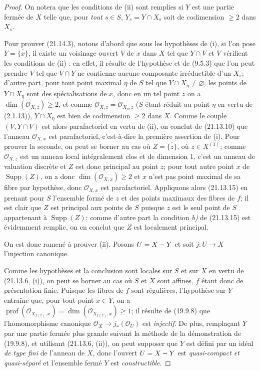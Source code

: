 \begin{proof}
On notera que les conditions de (ii) sont remplies si $Y$ est une partie fermée de $X$
telle que, pour \emph{tout} $s\in S$, $Y_s=Y\cap X_s$ soit de codimension $\geq2$ dans
$X_s$.

Pour prouver (21.14.3), notons d'abord que sous les hypothèses de (i), si l'on
pose $Y=\overline{\{x\}}$, il existe un voisinage ouvert $V$ de $x$ dans $X$ tel que
$Y\cap V$ et $V$ vérifient les conditions de (ii) : en effet, il résulte de l'hypothèse
et de (9.5.3) que l'on peut prendre $V$ tel que $V\cap Y$ ne contienne aucune
composante irréductible d'un $X_s$; d'autre part, pour tout point maximal $\eta$ de
$S$ tel que $Y\cap X_\eta\neq\varnothing$, les points de $Y\cap X_\eta$ sont des
spécialisations de $x$, donc en un tel point $z$ on a
$\dim(\mathcal O_{X,z})\geq2$, et comme
$\mathcal O_{X,z}=\mathcal O_{X_\eta,z}$ ($S$ étant réduit au point $\eta$ en vertu
de (2.1.13)), $Y\cap X_\eta$ est bien de codimension $\geq2$ dans $X$. Comme le
couple $(V,Y\cap V)$ est alors parafactoriel en vertu de (ii), on conclut de (21.13.10)
que l'anneau $\mathcal O_{X,x}$ est parafactoriel, c'est-à-dire la première assertion
de (i). Pour prouver la seconde, on peut se borner au cas où
$Z=\overline{\{z\}}$, où $z\in X^{(1)}$; comme $\mathcal O_{X,z}$ est un anneau local
intégralement clos et de dimension $1$, c'est un anneau de valuation discrète et $Z$
est donc principal au point $z$; pour tout autre point $x$ de
$\operatorname{Supp}(Z)$, on a donc $\dim(\mathcal O_{X,x})\geq2$ et $x$ n'est pas
point maximal de sa fibre par hypothèse, donc $\mathcal O_{X,x}$ est parafactoriel.
Appliquons alors (21.13.15) en prenant pour $S$ l'ensemble formé de $z$ et des points
maximaux des fibres de $f$; il est clair que $Z$ est principal aux points de $S$
puisque $z$ est le seul point de $S$ appartenant à $\operatorname{Supp}(Z)$; comme
d'autre part la condition \emph{b)} de (21.13.15) est évidemment remplie, on en conclut que
$Z$ est localement principal.

On est donc ramené à prouver (ii). Posons $U=X- Y$ et soit $j:U\to X$ l'injection
canonique.

Comme les hypothèses et la conclusion sont locales sur $S$ et sur $X$ en vertu de
(21.13.6, (i)), on peut se borner au cas où $S$ et $X$ sont affines, $f$ étant donc de
présentation finie. Puisque les fibres de $f$ sont régulières, l'hypothèse sur $Y$
entraîne que, pour tout point $x\in Y$, on a $\operatorname{prof}(\mathcal O_{X_{f(x)},x})=\dim(\mathcal O_{X_{f(x)},x})\geq1$;
il résulte de (19.9.8) que l'homomorphisme canonique
$\mathcal O_X\to j_*(\mathcal O_U)$ est \emph{injectif}. De plus, remplaçant $Y$ par
une partie fermée plus grande suivant la méthode de la démonstration de (19.9.8), et
utilisant (21.13.6, (ii)), on peut supposer que $Y$ est défini par un idéal \emph{de
type fini} de l'anneau de $X$, donc l'ouvert $U=X- Y$ est \emph{quasi-compact et
quasi-séparé} et l'ensemble fermé $Y$ est \emph{constructible}.


\end{proof}

